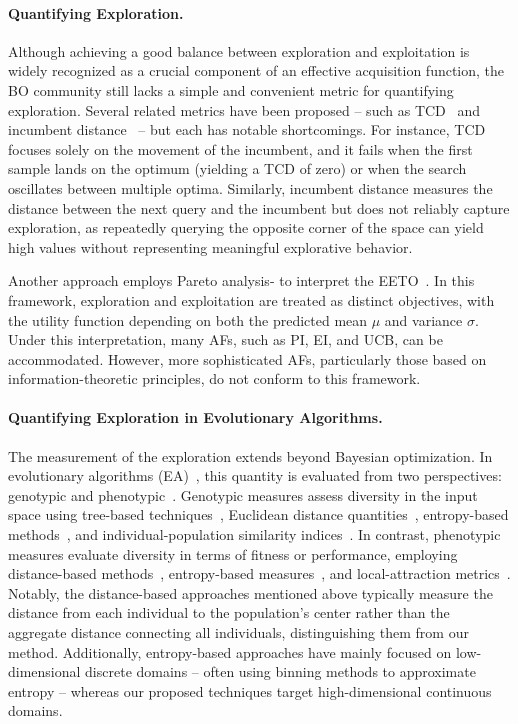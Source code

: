 \paragraph{Quantifying Exploration.}
Although achieving a good balance between exploration and exploitation is widely recognized as a crucial component of an effective acquisition function, the \ac{BO} community still lacks a simple and convenient metric for quantifying exploration. Several related metrics have been proposed -- such as \ac{TCD}~\citep[Fig.~6]{eriksson2019scalable} and incumbent distance~\citep[Fig.~20]{hvarfner2024vanilla} -- but each has notable shortcomings. For instance, \ac{TCD} focuses solely on the movement of the incumbent, and it fails when the first sample lands on the optimum (yielding a \ac{TCD} of zero) or when the search oscillates between multiple optima. Similarly, incumbent distance measures the distance between the next query and the incumbent but does not reliably capture exploration, as repeatedly querying the opposite corner of the space can yield high values without representing meaningful explorative behavior.

Another approach employs Pareto analysis- 
to interpret the \ac{EETO}~\citep{bischl2014moi,feng2015multiobjective,vzilinskas2019bi,de2021greed}. In this framework, exploration and exploitation are treated as distinct objectives, with the utility function depending on both the predicted mean $\mu$ and variance $\sigma$. Under this interpretation, many \acp{AF}, such as \ac{PI}, \ac{EI}, and \ac{UCB}, can be accommodated. However, more sophisticated \acp{AF}, particularly those based on information-theoretic principles, do not conform to this framework.

\paragraph{Quantifying Exploration in Evolutionary Algorithms.}
The measurement of the exploration extends beyond Bayesian optimization. In evolutionary algorithms (EA)~\citep{eiben2015introduction}, this quantity is evaluated from two perspectives: genotypic and phenotypic~\citep{vcrepinvsek2013exploration}. Genotypic measures assess diversity in the input space using tree-based techniques~\citep{burke2002advanced,vcrepinvsek2011analysis}, Euclidean distance quantities~\citep{mcginley2011maintaining}, entropy-based methods~\citep{misevivcius2011generation}, and individual-population similarity indices~\citep{inoue2015analyzing}. In contrast, phenotypic measures evaluate diversity in terms of fitness or performance, employing distance-based methods~\citep{chaiyaratana2007effects}, entropy-based measures~\citep{adra2010diversity, turkey2014model}, and local-attraction metrics~\citep{jerebic2021novel}. Notably, the distance-based approaches mentioned above typically measure the distance from each individual to the population's center rather than the aggregate distance connecting all individuals, distinguishing them from our method. Additionally, entropy-based approaches have mainly focused on low-dimensional discrete domains -- often using binning methods to approximate entropy -- whereas our proposed techniques target high-dimensional continuous domains.

